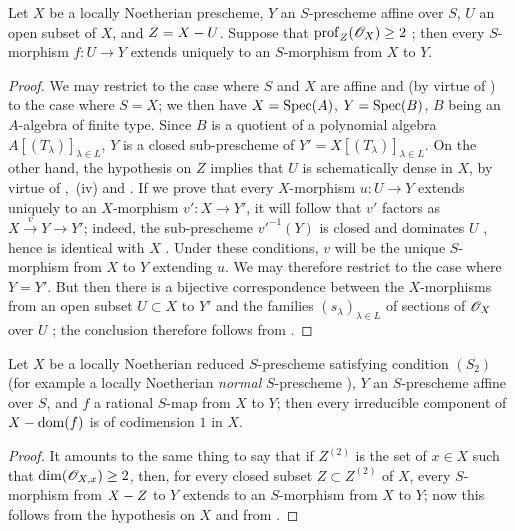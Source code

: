 \begin{proposition}[20.4.11]
\label{IV.20.4.11}
Let $X$ be a locally Noetherian prescheme, $Y$ an $S$-prescheme affine over $S$, $U$ an open subset of $X$, and $Z=X- U$.
Suppose that $\operatorname{prof}_Z(\mathscr{O}_X)\geq 2$ ; then every $S$-morphism $f:U\to Y$ extends uniquely to an $S$-morphism from $X$ to $Y$.
\end{proposition}

\begin{proof}
We may restrict to the case where $S$ and $X$ are affine and (by virtue of ) to the case where $S=X$; we then have $X=\operatorname{Spec}(A)$, $Y=\operatorname{Spec}(B)$, $B$ being an $A$-algebra of finite type.
Since $B$ is a quotient of a polynomial algebra $A[(T_\lambda)]_{\lambda\in L}$, $Y$ is a closed sub-prescheme of $Y'=X[(T_\lambda)]_{\lambda\in L}$.
On the other hand, the hypothesis on $Z$ implies that $U$ is schematically dense in $X$, by virtue of ,~(iv) and .
If we prove that every $X$-morphism $u:U\to Y$ extends uniquely to an $X$-morphism $v':X\to Y'$, it will follow that $v'$ factors as $X\xrightarrow{v}Y\to Y'$; indeed, the sub-prescheme $v'^{-1}(Y)$ is closed and dominates $U$ , hence is identical with $X$ .
Under these conditions, $v$ will be the unique $S$-morphism from $X$ to $Y$ extending $u$.
We may therefore restrict to the case where $Y=Y'$.
But then there is a bijective correspondence between the $X$-morphisms from an open subset $U\subset X$ to $Y'$ and the families $(s_\lambda)_{\lambda\in L}$ of sections of $\mathscr{O}_X$ over $U$ ; the conclusion therefore follows from .
\end{proof}

\begin{corollary}[20.4.12]
\label{IV.20.4.12}
Let $X$ be a locally Noetherian reduced $S$-prescheme satisfying condition $(S_2)$  \textup{(for example a locally Noetherian \emph{normal} $S$-prescheme )}, $Y$ an $S$-prescheme affine over $S$, and $f$ a rational $S$-map from $X$ to $Y$; then every irreducible component of $X-\operatorname{dom}(f)$ is of codimension $1$ in $X$.
\end{corollary}

\begin{proof}
It amounts to the same thing to say that if $Z^{(2)}$ is the set of $x\in X$ such that $\dim(\mathscr{O}_{X,x})\geq 2$, then, for every closed subset $Z\subset Z^{(2)}$ of $X$, every $S$-morphism from $X- Z$ to $Y$ extends to an $S$-morphism from $X$ to $Y$; now this follows from the hypothesis on $X$  and from .
\end{proof}

